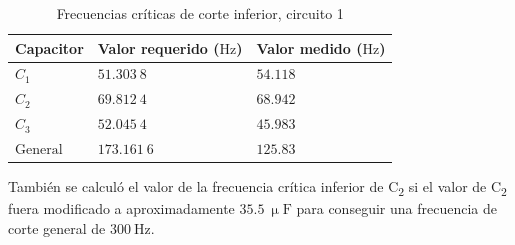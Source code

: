 \documentclass[journal]{IEEEtran}
\begin{document}
\begin{table}[H]
        \centering
        \renewcommand{\arraystretch}{1.5}
        \caption{Frecuencias críticas de corte inferior, circuito 1}
        \begin{tabular}{ >{\centering\arraybackslash}m{2.5cm} >{\centering\arraybackslash}m{2.5cm} >{\centering\arraybackslash}m{2.5cm} }
                \hline
            Capacitor & Valor requerido ($\mathrm{Hz}$) & Valor medido ($\mathrm{Hz}$)\\ 
            \hline
            \centering
            $C_1$ & $51.303~8$  & $54.118$  \\ 
            $C_2$ & $69.812~4$  & $68.942$ \\
            $C_3$ & $52.045~4$  & $45.983$ \\
            $\mathrm{General}$ & $173.161~6$  & $125.83$ \\
            \hline
        \end{tabular}
        \label{tabla4}
    \end{table}    

También se calculó el valor de la frecuencia crítica inferior de C\textsubscript{2} si el valor de C\textsubscript{2} fuera modificado a aproximadamente $35.5~\upmu\mathrm{F}$ para conseguir una frecuencia de corte
general de $300~\mathrm{Hz}$.
\end{document}
